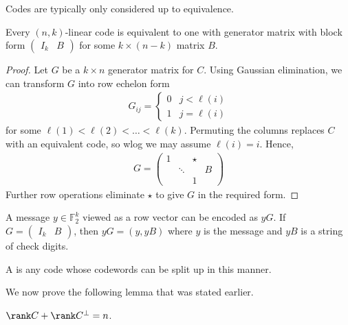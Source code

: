 Codes are typically only considered up to equivalence.

\begin{lemma}
    Every $(n, k)$-linear code is equivalent to one with generator matrix with block form $\begin{pmatrix}
        I_k & B
    \end{pmatrix}$ for some $k \times (n - k)$ matrix $B$.
\end{lemma}

\begin{proof}
    Let $G$ be a $k \times n$ generator matrix for $C$.
    Using Gaussian elimination, we can transform $G$ into row echelon form
    \begin{align*}
        G_{ij} = \begin{cases}
            0 & j < \ell(i) \\
            1 & j = \ell(i)
        \end{cases}
    \end{align*}
    for some $\ell(1) < \ell(2) < \dots < \ell(k)$.
    Permuting the columns replaces $C$ with an equivalent code, so wlog we may assume $\ell(i) = i$.
    Hence,
    \begin{align*}
        G = \begin{pmatrix}
            1 & & \star \\
            & \ddots & & B \\
            & & 1
        \end{pmatrix}
    \end{align*}
    Further row operations eliminate $\star$ to give $G$ in the required form.
\end{proof}

A message $y \in \mathbb F_2^k$ viewed as a row vector can be encoded as $yG$.
If $G = \begin{pmatrix}
    I_k & B
\end{pmatrix}$, then $yG = (y, yB)$ where $y$ is the message and $yB$ is a string of check digits.

\begin{definition}
    A  is any code whose codewords can be split up in this manner.
\end{definition}

We now prove the following lemma that was stated earlier.
\begin{lemma}
    $\rank C + \rank C^\perp = n$.
\end{lemma}


